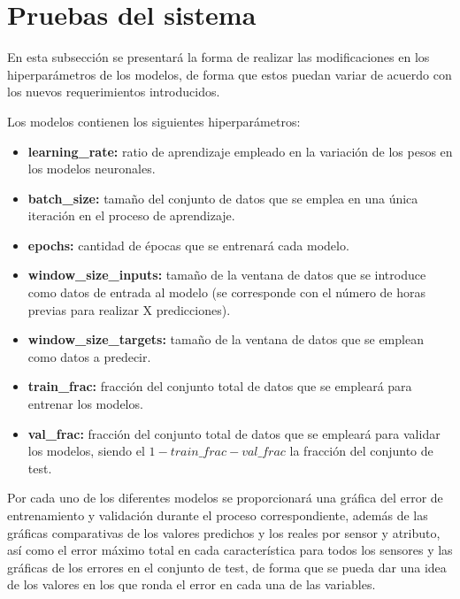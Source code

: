 
\section{Pruebas del sistema}
En esta subsección se presentará la forma de realizar las modificaciones en los hiperparámetros de los modelos, de forma que estos puedan variar de acuerdo con los nuevos requerimientos introducidos.

Los modelos contienen los siguientes hiperparámetros:
\begin{itemize}
    \item \textbf{learning\_rate:} ratio de aprendizaje empleado en la variación de los pesos en los modelos neuronales.
    \item \textbf{batch\_size:} tamaño del conjunto de datos que se emplea en una única iteración en el proceso
        de aprendizaje.
    \item \textbf{epochs:} cantidad de épocas que se entrenará cada modelo.
    \item \textbf{window\_size\_inputs:} tamaño de la ventana de datos que se introduce como datos de entrada al modelo
        (se corresponde con el número de horas previas para realizar X predicciones).
    \item \textbf{window\_size\_targets:} tamaño de la ventana de datos que se emplean como datos a predecir.
    \item \textbf{train\_frac:} fracción del conjunto total de datos que se empleará para entrenar los modelos.
    \item \textbf{val\_frac:} fracción del conjunto total de datos que se empleará para validar los modelos, siendo el 
        \(1 - train\_frac - val\_frac\) la fracción del conjunto de test.
\end{itemize}

Por cada uno de los diferentes modelos se proporcionará una gráfica del error de entrenamiento y validación
durante el proceso correspondiente, además de las gráficas comparativas de los valores predichos y 
los reales por sensor y atributo, así como el error máximo total en cada característica para todos los sensores y las gráficas
de los errores en el conjunto de test, de forma que se 
pueda dar una idea de los valores en los que ronda el error en cada una de las variables. 

